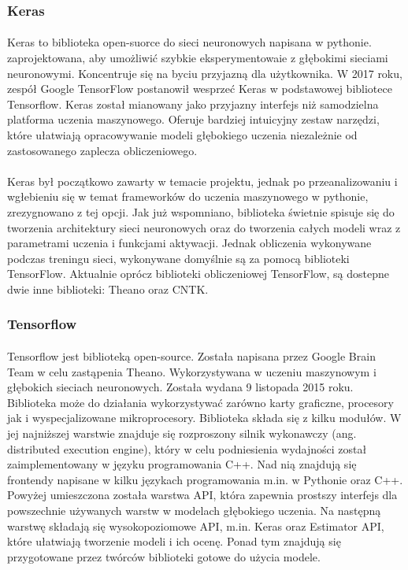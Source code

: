 \documentclass[a4paper,11pt]{article}
\begin{document}
\subsubsection{Keras}
\paragraph{}Keras to biblioteka open-suorce do sieci neuronowych napisana w pythonie. zaprojektowana, aby umożliwić szybkie eksperymentowaie z głębokimi sieciami neuronowymi. Koncentruje się na byciu przyjazną dla użytkownika. W 2017 roku, zespół Google TensorFlow postanowił wesprzeć Keras w podstawowej bibliotece Tensorflow. Keras został mianowany jako przyjazny interfejs niż samodzielna platforma uczenia maszynowego. Oferuje bardziej intuicyjny zestaw narzędzi, które ułatwiają opracowywanie modeli głębokiego uczenia niezależnie od zastosowanego zaplecza obliczeniowego. 
\paragraph{}Keras był początkowo zawarty w temacie projektu, jednak po przeanalizowaniu i wgłebieniu się w temat frameworków do uczenia maszynowego w pythonie, zrezygnowano z tej opcji. Jak już wspomniano, biblioteka świetnie spisuje się do tworzenia architektury sieci neuronowych oraz do tworzenia całych modeli wraz z parametrami uczenia i funkcjami aktywacji. Jednak obliczenia wykonywane podczas treningu sieci, wykonywane domyślnie są za pomocą biblioteki TensorFlow. Aktualnie oprócz biblioteki obliczeniowej TensorFlow, są dostepne dwie inne biblioteki: Theano oraz CNTK.
\subsubsection{Tensorflow} 
\paragraph{}Tensorflow jest biblioteką open-source. Została napisana przez Google Brain Team w celu zastąpenia Theano. Wykorzystywana w uczeniu maszynowym i głębokich sieciach neuronowych. Została wydana 9 listopada 2015 roku. Biblioteka może do działania wykorzystywać zarówno karty graficzne, procesory jak i wyspecjalizowane mikroprocesory. Biblioteka składa się z kilku modułów. W jej najniższej warstwie znajduje się rozproszony silnik wykonawczy (ang. distributed execution engine), który w celu podniesienia wydajności został zaimplementowany w języku programowania C++. Nad nią znajdują się frontendy napisane w kilku językach programowania m.in. w Pythonie oraz C++. Powyżej umieszczona została warstwa API, która zapewnia prostszy interfejs dla powszechnie używanych warstw w modelach głębokiego uczenia. Na następną warstwę składają się wysokopoziomowe API, m.in. Keras oraz Estimator API, które ułatwiają tworzenie modeli i ich ocenę. Ponad tym znajdują się przygotowane przez twórców biblioteki gotowe do użycia modele.
\end{document}
